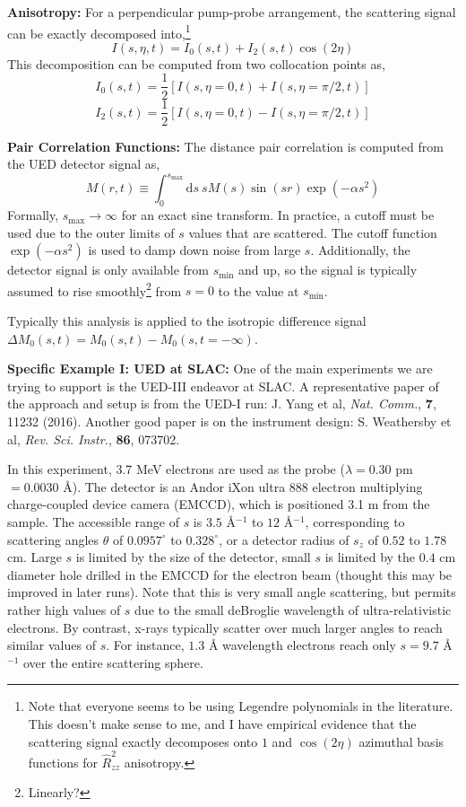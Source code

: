 \documentclass[fleqn,oneside,12pt]{article}
\begin{document}
\textbf{Anisotropy:} For a perpendicular pump-probe arrangement, the scattering
signal can be exactly decomposed into,\footnote{Note that everyone seems to be
using Legendre polynomials in the literature. This doesn't make sense to me, and
I have empirical evidence that the scattering signal exactly decomposes onto $1$
and $\cos (2 \eta)$ azimuthal basis functions for $\hat R_{zz}^2$ anisotropy.}
\[
I (s, \eta, t)
=
I_{0} (s, t)
+
I_{2} (s, t) \cos (2 \eta)
\]
This decomposition can be computed from two collocation points as,
\[
I_{0} (s, t)
=
\frac{1}{2}
\left [
I (s, \eta=0, t)
+
I (s, \eta=\pi/2, t)
\right ]
\]
\[
I_{2} (s, t)
=
\frac{1}{2}
\left [
I (s, \eta=0, t)
-
I (s, \eta=\pi/2, t)
\right ]
\]

\textbf{Pair Correlation Functions:} The distance pair correlation is computed
from the UED detector signal as,
\[
M (r, t)
\equiv
\int_{0}^{s_{\mathrm{max}}}
\mathrm{d} s \
s M(s)
\sin (sr)
\exp(-\alpha s^2)
\]
Formally, $s_{\mathrm{max}} \rightarrow \infty$ for an exact sine transform. In
practice, a cutoff must be used due to the outer limits of $s$ values that are
scattered. The cutoff function $\exp(-\alpha s^2)$ is used to damp down noise
from large $s$. Additionally, the detector signal is only available from
$s_{\mathrm{min}}$ and up, so the signal is typically assumed to rise
smoothly\footnote{Linearly?} from $s=0$ to the value at $s_{\mathrm{min}}$.

Typically this analysis is applied to the isotropic difference signal $\Delta
M_{0} (s, t) = M_{0} (s, t) - M_{0} (s, t = -\infty)$.

\textbf{Specific Example I: UED at SLAC:} One of the main experiments we are
trying to support is the UED-III endeavor at SLAC. A representative paper of the
approach and setup is from the UED-I run: J. Yang et al, \emph{Nat. Comm.},
\textbf{7}, 11232 (2016). Another good paper is on the instrument design: S.
Weathersby et al, \emph{Rev. Sci. Instr.}, \textbf{86}, 073702. 

In this experiment, 3.7 MeV electrons are used as the probe ($\lambda = 0.30$ pm
$= 0.0030$ \AA{}). The detector is an Andor iXon ultra 888 electron multiplying
charge-coupled device camera (EMCCD), which is positioned 3.1 m from the sample.
The accessible range of $s$ is $3.5$ \AA{}$^{-1}$ to $12$ \AA{}$^{-1}$,
corresponding to scattering angles $\theta$ of $0.0957^{\circ}$ to
$0.328^{\circ}$, or a detector radius of $s_{z}$ of $0.52$ to $1.78$ cm. Large
$s$ is limited by the size of the detector, small $s$ is limited by the $0.4$ cm
diameter hole drilled in the EMCCD for the electron beam (thought this may be
improved in later runs). Note that this is very small angle scattering, but
permits rather high values of $s$ due to the small deBroglie wavelength of
ultra-relativistic electrons. By contrast, x-rays typically scatter over much
larger angles to reach similar values of $s$. For instance, $1.3$ \AA{}
wavelength electrons reach only $s = 9.7$ \AA{}$^{-1}$ over the entire
scattering sphere.
\end{document}
